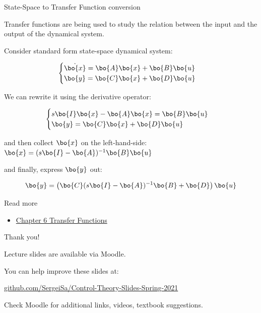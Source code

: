 \documentclass{beamer}
\begin{document}
\begin{frame}{State-Space to Transfer Function conversion}
\begin{flushleft}

Transfer functions are being used to study the relation between the input and the output of the dynamical system.

\bigskip

Consider standard form state-space dynamical system:

\begin{equation}
\begin{cases}
\dot{\bo{x}} = \bo{A}\bo{x} + \bo{B}\bo{u} \\
     \bo{y}  = \bo{C}\bo{x} + \bo{D}\bo{u}
\end{cases}
\end{equation}

We can rewrite it using the derivative operator:

\begin{equation}
\begin{cases}
s\bo{I}\bo{x} -\bo{A}\bo{x} = \bo{B}\bo{u} \\
\bo{y}  = \bo{C}\bo{x} + \bo{D}\bo{u}
\end{cases}
\end{equation}

and then collect $\bo{x}$ on the left-hand-side: $\bo{x} = (s\bo{I} -\bo{A})^{-1} \bo{B}\bo{u}$

and finally, express $\bo{y}$ out:

\begin{equation}
\bo{y}  = \left( \bo{C}(s\bo{I} -\bo{A})^{-1} \bo{B} + \bo{D} \right) \bo{u}
\end{equation}

\end{flushleft}
\end{frame}




\begin{frame}{Read more}

\begin{itemize}
\item \href{https://www.cds.caltech.edu/~murray/courses/cds101/fa04/caltech/am04_ch6-3nov04.pdf}{Chapter 6 Transfer Functions}


\end{itemize}

\end{frame}



\begin{frame}{Thank you!}
\centerline{Lecture slides are available via Moodle.}
\bigskip
\centerline{You can help improve these slides at:}
\centerline{\href{https://github.com/SergeiSa/Control-Theory-Slides-Spring-2021}{github.com/SergeiSa/Control-Theory-Slides-Spring-2021}}
\bigskip
\centerline{Check Moodle for additional links, videos, textbook suggestions.}
\end{frame}
\end{document}
